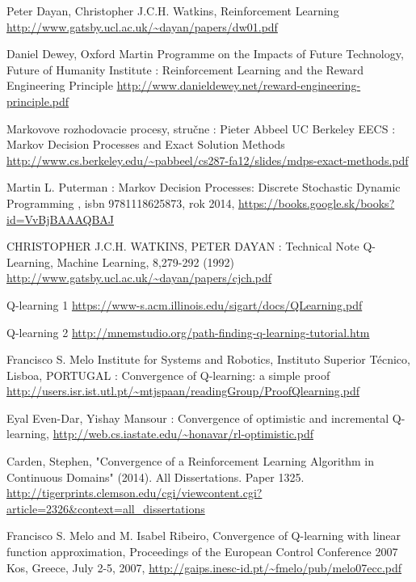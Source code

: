 \documentclass{acmbulletin}
\begin{document}
\begin{thebibliography}{99}                                \label{literatura}


Peter Dayan, Christopher J.C.H. Watkins,
Reinforcement Learning
\url{http://www.gatsby.ucl.ac.uk/~dayan/papers/dw01.pdf}


Daniel Dewey, Oxford Martin Programme on the Impacts of Future Technology,
Future of Humanity Institute :
Reinforcement Learning and the Reward Engineering Principle
\url{http://www.danieldewey.net/reward-engineering-principle.pdf}



 Markovove rozhodovacie procesy, stručne :
Pieter Abbeel  UC Berkeley EECS : Markov Decision Processes and Exact Solution Methods
\url{http://www.cs.berkeley.edu/~pabbeel/cs287-fa12/slides/mdps-exact-methods.pdf}

 Martin L. Puterman : Markov Decision Processes: Discrete Stochastic Dynamic Programming
, isbn 9781118625873, rok 2014, \url{https://books.google.sk/books?id=VvBjBAAAQBAJ}


CHRISTOPHER  J.C.H. WATKINS, PETER DAYAN : Technical Note Q-Learning,
Machine Learning,  8,279-292 (1992)
\url{http://www.gatsby.ucl.ac.uk/~dayan/papers/cjch.pdf}

 Q-learning 1
\url{https://www-s.acm.illinois.edu/sigart/docs/QLearning.pdf}

 Q-learning 2
\url{http://mnemstudio.org/path-finding-q-learning-tutorial.htm}


 Francisco S. Melo
Institute for Systems and Robotics,
Instituto Superior Técnico,
Lisboa, PORTUGAL : Convergence of Q-learning:  a simple proof
\url{http://users.isr.ist.utl.pt/~mtjspaan/readingGroup/ProofQlearning.pdf}

 Eyal Even-Dar, Yishay Mansour :
Convergence of optimistic and incremental Q-learning,
\url{http://web.cs.iastate.edu/~honavar/rl-optimistic.pdf}


Carden, Stephen, "Convergence of a Reinforcement Learning Algorithm in Continuous Domains" (2014).
All Dissertations. Paper 1325.
\url{http://tigerprints.clemson.edu/cgi/viewcontent.cgi?article=2326&context=all_dissertations}

 Francisco S. Melo and M. Isabel Ribeiro,
Convergence of Q-learning with linear function approximation,
Proceedings of the European Control Conference 2007 Kos, Greece, July 2-5, 2007,
\url{http://gaips.inesc-id.pt/~fmelo/pub/melo07ecc.pdf}


\end{thebibliography}
\end{document}
